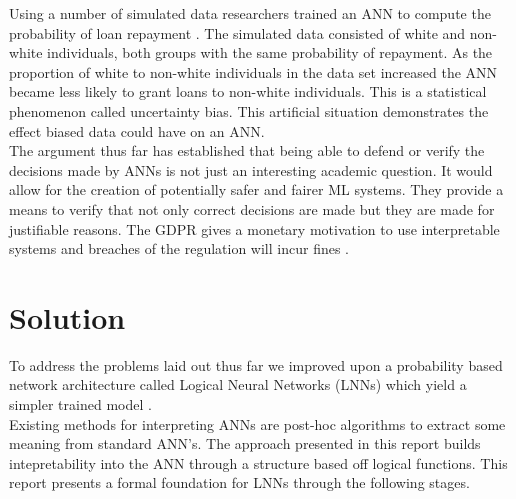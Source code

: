 Using a number of simulated data researchers trained an ANN to compute the probability of loan repayment \cite{goodman2016european}. The simulated data consisted of white and non-white individuals, both groups with the same probability of repayment. As the proportion of white to non-white individuals in the data set increased the ANN became less likely to grant loans to non-white individuals. This is a statistical phenomenon called uncertainty bias. This artificial situation demonstrates the effect biased data could have on an ANN.\\

The argument thus far has established that being able to defend or verify the decisions made by ANNs is not just an interesting academic question. It would allow for the creation of potentially safer and fairer ML systems. They provide a means to verify that not only correct decisions are made but they are made for justifiable reasons. The GDPR gives a monetary motivation to use interpretable systems and breaches of the regulation will incur fines \cite{goodman2016european}.\\

\section{Solution}
To address the problems laid out thus far we improved upon a probability based network architecture called Logical Neural Networks (LNNs) which yield a simpler trained model \cite{LearningLogicalActivations}.\\

Existing methods for interpreting ANNs are post-hoc algorithms to extract some meaning from standard ANN's. The approach presented in this report builds intepretability into the ANN through a structure based off logical functions. This report presents a formal foundation for LNNs through the following stages.

